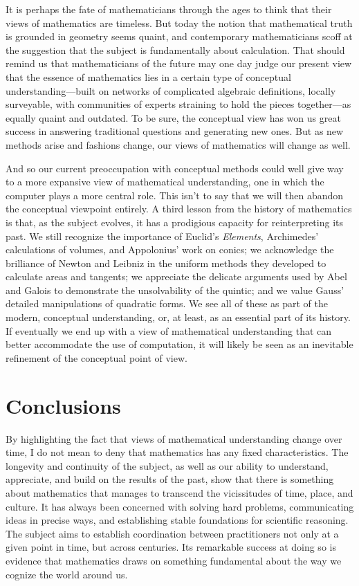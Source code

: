\documentclass[12pt]{amsart}
\theoremstyle{definition}
\theoremstyle{remark}
\numberwithin{equation}{section}
\begin{document}
It is perhaps the fate of mathematicians through the ages to think that their views of mathematics are timeless. But today the notion that mathematical truth is grounded in geometry seems quaint, and contemporary mathematicians scoff at the suggestion that the subject is fundamentally about calculation. That should remind us that mathematicians of the future may one day judge our present view that the essence of mathematics lies in a certain type of conceptual understanding---built on networks of complicated algebraic definitions, locally surveyable, with communities of experts straining to hold the pieces together---as equally quaint and outdated. To be sure, the conceptual view has won us great success in answering traditional questions and generating new ones. But as new methods arise and fashions change, our views of mathematics will change as well.

And so our current preoccupation with conceptual methods could well give way to a more expansive view of mathematical understanding, one in which the computer plays a more central role. This isn't to say that we will then abandon the conceptual viewpoint entirely. A third lesson from the history of mathematics is that, as the subject evolves, it has a prodigious capacity for reinterpreting its past. We still recognize the importance of Euclid's \emph{Elements}, Archimedes' calculations of volumes, and Appolonius' work on conics; we acknowledge the brilliance of Newton and Leibniz in the uniform methods they developed to calculate areas and tangents; we appreciate the delicate arguments used by Abel and Galois to demonstrate the unsolvability of the quintic; and we value Gauss' detailed manipulations of quadratic forms. We see all of these as part of the modern, conceptual understanding, or, at least, as an essential part of its history. If eventually we end up with a view of mathematical understanding that can better accommodate the use of computation, it will likely be seen as an inevitable refinement of the conceptual point of view.

\section{Conclusions}

By highlighting the fact that views of mathematical understanding change over time, I do not mean to deny that mathematics has any fixed characteristics. The longevity and continuity of the subject, as well as our ability to understand, appreciate, and build on the results of the past, show that there is something about mathematics that manages to transcend the vicissitudes of time, place, and culture. It has always been concerned with solving hard problems, communicating ideas in precise ways, and establishing stable foundations for scientific reasoning. The subject aims to establish coordination between practitioners not only at a given point in time, but across centuries. Its remarkable success at doing so is evidence that mathematics draws on something fundamental about the way we cognize the world around us.
\end{document}

